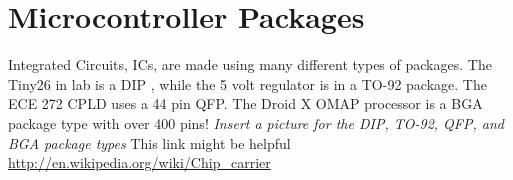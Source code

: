 \documentclass{article}
\begin{document}
\section{Microcontroller Packages}
Integrated Circuits, ICs, are made using many different types of packages. The Tiny26 in lab is a DIP , while the 5 volt regulator is in a TO-92 package. The ECE 272 CPLD uses a 44 pin QFP. The Droid X OMAP processor is a BGA package type with over 400 pins! \newline
\newline
\emph{Insert a picture for the DIP, TO-92, QFP, and BGA package types}\newline
\newline
This link might be helpful \newline
\newline
\url{http://en.wikipedia.org/wiki/Chip_carrier}\newline
\newline


\end{document}
